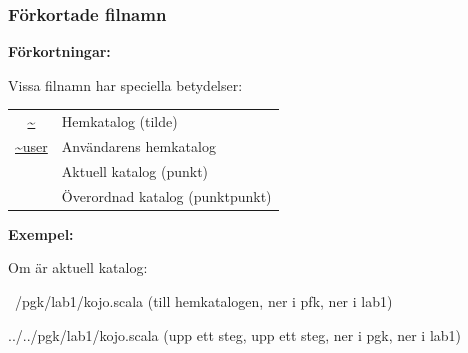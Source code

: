 





\begin{frame}[fragile=singleslide]
    \frametitle{Förkortade filnamn}

    \textbf{Förkortningar:}

    Vissa filnamn har speciella betydelser:

    \blankline
    \begin{tabular}{cl}
        \url{~}     & Hemkatalog (tilde) \\
        \url{~user} & Användarens hemkatalog \\
        \code{.}    & Aktuell katalog (punkt) \\
        \code{..}   & Överordnad katalog (punktpunkt) \\
    \end{tabular}
    \blankline

    \textbf{Exempel:}

    Om  är aktuell katalog:

    \begin{GobbleCode}{6}
        ~/pgk/lab1/kojo.scala
        (till hemkatalogen, ner i pfk, ner i lab1)

        ../../pgk/lab1/kojo.scala
        (upp ett steg, upp ett steg, ner i pgk, ner i lab1)
    \end{GobbleCode}

\end{frame}


